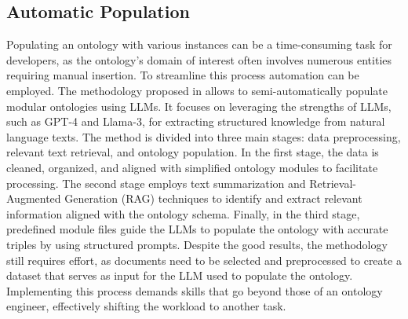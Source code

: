 \subsection{Automatic Population}
\label{subsection:4_3_7_automatic}
Populating an ontology with various instances can be a time-consuming task for developers, as the ontology's domain of interest often involves numerous entities requiring manual insertion.
To streamline this process automation can be employed.
The methodology proposed in \cite{norouzi2024ontology} allows to semi-automatically populate modular ontologies using LLMs.
It focuses on leveraging the strengths of LLMs, such as GPT-4 and Llama-3, for extracting structured knowledge from natural language texts.
The method is divided into three main stages: data preprocessing, relevant text retrieval, and ontology population.
In the first stage, the data is cleaned, organized, and aligned with simplified ontology modules to facilitate processing.
The second stage employs text summarization and Retrieval-Augmented Generation (RAG) techniques to identify and extract relevant information aligned with the ontology schema.
Finally, in the third stage, predefined module files guide the LLMs to populate the ontology with accurate triples by using structured prompts.
Despite the good results, the methodology still requires effort, as documents need to be selected and preprocessed to create a dataset that serves as input for the LLM used to populate the ontology. Implementing this process demands skills that go beyond those of an ontology engineer, effectively shifting the workload to another task.\\ 


